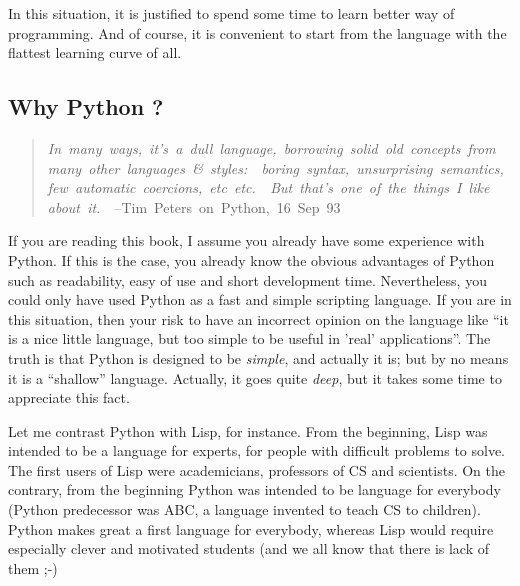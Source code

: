 \documentclass[10pt,english]{article}
\begin{document}
In this situation, it is justified to spend some time to learn better
way of programming. And of course, it is convenient to start from
the language with the flattest learning curve of all.



\hypertarget{why-python}{}
\subsection*{Why Python ?}
\begin{quote}
\begin{flushleft}
\emph{In~many~ways,~it's~a~dull~language,~borrowing~solid~old~concepts~from~~\\
many~other~languages~{\&}~styles:~~boring~syntax,~unsurprising~semantics,~\\
few~automatic~coercions,~etc~etc.~~But~that's~one~of~the~things~I~like~\\
about~it.}~~--Tim~Peters~on~Python,~16~Sep~93
\end{flushleft}
\end{quote}

If you are reading this book, I assume you already  have some experience
with Python. If this is the case, you already know the obvious advantages
of Python such as readability, easy of use and short development time.
Nevertheless, you could only have used Python as a fast and simple
scripting language. If you are in this situation, then your risk to
have an incorrect opinion on the language like ``it is a nice little
language, but too simple to be useful in 'real' applications''. The
truth is that Python is designed to be \emph{simple}, and actually it
is; but by no means it is a ``shallow'' language. Actually, it goes
quite \emph{deep}, but it takes some time to appreciate this fact.

Let me contrast Python with Lisp, for instance. From the beginning,
Lisp was intended to be a language for experts, for people with difficult 
problems to solve. The first
users of Lisp were academicians, professors of CS and scientists.
On the contrary, from the beginning Python 
was intended to be language for everybody (Python predecessor was ABC, 
a language invented to teach CS to children). Python makes great a first 
language for everybody, whereas Lisp would require especially
clever and motivated students (and we all know that there is lack
of them ;-)
\end{document}
